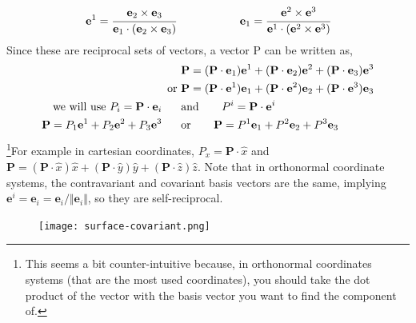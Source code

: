 \begin{equation}
    \mathbf{e}^1 = \cfrac{\mathbf{e}_2 \times \mathbf{e}_3}{\mathbf{e}_1 \cdot (\mathbf{e}_2 \times \mathbf{e}_3)} \hspace{2cm} \mathbf{e}_1 = \cfrac{\mathbf{e}^2 \times \mathbf{e}^3}{\mathbf{e}^1 \cdot (\mathbf{e}^2 \times \mathbf{e}^3)}
\end{equation}
Since these are reciprocal sets of vectors, a vector P can be written as,
\begin{align}
    &\mathbf{P} =  (\mathbf{P} \cdot \mathbf{e}_1) \mathbf{e}^1 + (\mathbf{P} \cdot \mathbf{e}_2) \mathbf{e}^2 + (\mathbf{P} \cdot \mathbf{e}_3) \mathbf{e}^3 \\
    \text{or } &\mathbf{P} =  (\mathbf{P} \cdot \mathbf{e}^1) \mathbf{e}_1 + (\mathbf{P} \cdot \mathbf{e}^2) \mathbf{e}_2 + (\mathbf{P} \cdot \mathbf{e}^3) \mathbf{e}_3 \\
    \text{we will use } P_i =  \mathbf{P} \cdot \mathbf{e}_i \hspace{.6cm}&\text{and }\hspace{.6cm} P^i =  \mathbf{P} \cdot \mathbf{e}^i \\
    \mathbf{P} =  P_1 \mathbf{e}^1 + P_2 \mathbf{e}^2 + P_3 \mathbf{e}^3 \hspace{.6cm}&\text{or }\hspace{.6cm} \mathbf{P} =  P^1 \mathbf{e}_1 + P^2 \mathbf{e}_2 + P^3 \mathbf{e}_3 
\end{align}
\footnote{This seems a bit counter-intuitive because, in orthonormal coordinates systems (that are the most used coordinates), you should take the dot product of the vector with the basis vector you want to find the component of.}For example in cartesian coordinates, $P_x = \mathbf{P} \cdot \hat{x}$ and \(\mathbf{P} = (\mathbf{P} \cdot \hat{x}) \hat{x} + (\mathbf{P} \cdot \hat{y}) \hat{y} + (\mathbf{P} \cdot \hat{z}) \hat{z}\). Note that in orthonormal coordinate systems, the contravariant and covariant basis vectors are the same, implying \(\mathbf{e}^i = \mathbf{e}_i = \mathbf{e}_i / \Vert \mathbf{e}_i \Vert\), so they are self-reciprocal.

\begin{figure}[H]
    \centering
    \texttt{[image: surface-covariant.png]}
\end{figure}

